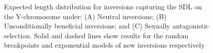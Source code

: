 \documentclass{article}
\begin{document}
 \begin{figure}[htbp]
 \centering
 \caption{Expected length distribution for inversions capturing the SDL on the Y-chromosome under: (A) Neutral inversions; (B) Unconditionally beneficial inversions; and (C) Sexually antagonistic selection. Solid and dashed lines show results for the random breakpoints and exponential models of new inversions respectively}
 \label{fig:invSizeFig}
 \end{figure}
 \newpage{}


 \newpage{}
\end{document}
